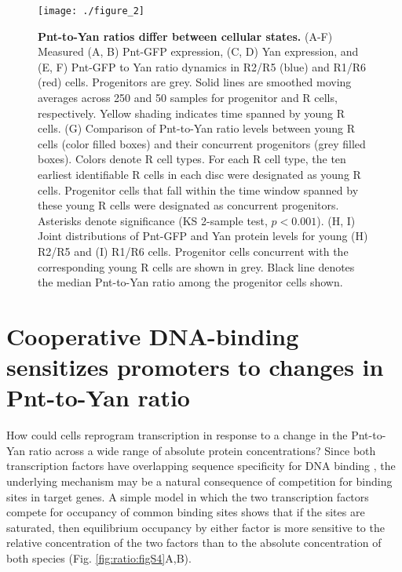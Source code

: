 \begin{figure}[h!]
\centering
\vspace{0pt}
\texttt{[image: ./figure\_2]}
\caption[Pnt-to-Yan ratios differ between cellular states.]{\textbf{Pnt-to-Yan ratios differ between cellular states.} (A-F) Measured (A, B) Pnt-GFP expression, (C, D) Yan expression, and (E, F) Pnt-GFP to Yan ratio dynamics in R2/R5 (blue) and R1/R6 (red) cells. Progenitors are grey. Solid lines are smoothed moving averages across 250 and 50 samples for progenitor and R cells, respectively. Yellow shading indicates time spanned by young R cells. (G) Comparison of Pnt-to-Yan ratio levels between young R cells (color filled boxes) and their concurrent progenitors (grey filled boxes). Colors denote R cell types. For each R cell type, the ten earliest identifiable R cells in each disc were designated as young R cells. Progenitor cells that fall within the time window spanned by these young R cells were designated as concurrent progenitors. Asterisks denote significance (KS 2-sample test, $p<0.001$). (H, I) Joint distributions of Pnt-GFP and Yan protein levels for young (H) R2/R5 and (I) R1/R6 cells. Progenitor cells concurrent with the corresponding young R cells are shown in grey. Black line denotes the median Pnt-to-Yan ratio among the progenitor cells shown.}
\label{fig:ratio:fig2}
\end{figure}

\section{Cooperative DNA-binding sensitizes promoters to changes in Pnt-to-Yan ratio }

How could cells reprogram transcription in response to a change in the Pnt-to-Yan ratio across a wide range of absolute protein concentrations? Since both transcription factors have overlapping sequence specificity for DNA binding \cite{Xu2000,Halfon2000,Flores2000,Wei2010,Webber2013,Webber2013a,Nitta2015}, the underlying mechanism may be a natural consequence of competition for binding sites in target genes. A simple model in which the two transcription factors compete for occupancy of common binding sites shows that if the sites are saturated, then equilibrium occupancy by either factor is more sensitive to the relative concentration of the two factors than to the absolute concentration of both species (Fig. \ref{fig:ratio:figS4}A,B).

